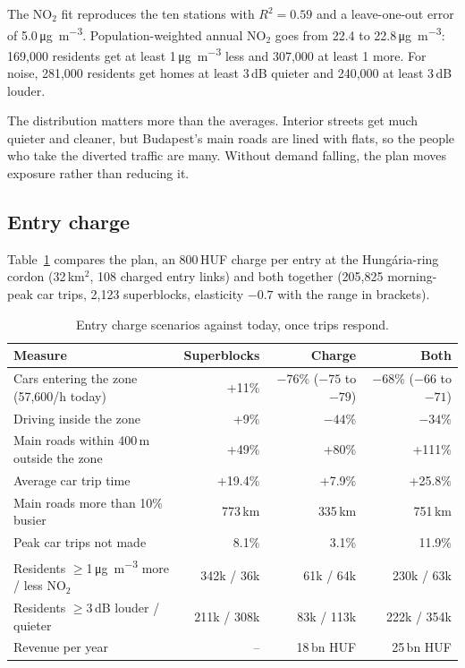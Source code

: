 \documentclass[11pt,a4paper]{article}
\begin{document}
The NO$_2$ fit reproduces the ten stations with $R^2=0.59$ and a leave-one-out error of 5.0\,\si{\micro\gram\per\cubic\metre}. Population-weighted annual NO$_2$ goes from 22.4 to 22.8\,\si{\micro\gram\per\cubic\metre}: 169,000 residents get at least 1\,\si{\micro\gram\per\cubic\metre} less and 307,000 at least 1 more. For noise, 281,000 residents get homes at least 3\,dB quieter and 240,000 at least 3\,dB louder.

The distribution matters more than the averages. Interior streets get much quieter and cleaner, but Budapest's main roads are lined with flats, so the people who take the diverted traffic are many. Without demand falling, the plan moves exposure rather than reducing it.

\subsection{Entry charge}

Table~\ref{tab:charge} compares the plan, an 800\,HUF charge per entry at the Hungária-ring cordon (32\,km$^2$, 108 charged entry links) and both together (205,825 morning-peak car trips, 2,123 superblocks, elasticity $-0.7$ with the range in brackets).

\begin{table}[ht]
\centering\small
\caption{Entry charge scenarios against today, once trips respond.}\label{tab:charge}
\begin{tabular}{@{}lrrr@{}}
\toprule
Measure & Superblocks & Charge & Both \\
\midrule
Cars entering the zone (57,600/h today) & +11\% & $-76$\% ($-75$ to $-79$) & $-68$\% ($-66$ to $-71$) \\
Driving inside the zone & +9\% & $-44$\% & $-34$\% \\
Main roads within 400\,m outside the zone & +49\% & +80\% & +111\% \\
Average car trip time & +19.4\% & +7.9\% & +25.8\% \\
Main roads more than 10\% busier & 773\,km & 335\,km & 751\,km \\
Peak car trips not made & 8.1\% & 3.1\% & 11.9\% \\
Residents $\geq$1\,\si{\micro\gram\per\cubic\metre} more / less NO$_2$ & 342k / 36k & 61k / 64k & 230k / 63k \\
Residents $\geq$3\,dB louder / quieter & 211k / 308k & 83k / 113k & 222k / 354k \\
Revenue per year & -- & 18\,bn HUF & 25\,bn HUF \\
\bottomrule
\end{tabular}
\end{table}
\end{document}
